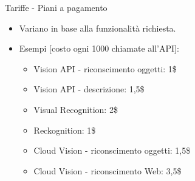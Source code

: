 %
\begin{frame}[t]{Tariffe - Piani a pagamento}
\begin{itemize}
	\item Variano in base alla funzionalità richiesta.
	\item Esempi [costo ogni 1000 chiamate all'API]:
	\begin{itemize}
		\item Vision API - riconscimento oggetti: 1\$
		\item Vision API - descrizione: 1,5\$
		\item Visual Recognition: 2\$
		\item Reckognition: 1\$
		\item Cloud Vision - riconscimento oggetti: 1,5\$
		\item Cloud Vision - riconscimento Web: 3,5\$
	\end{itemize}
\end{itemize}
\end{frame}
%
